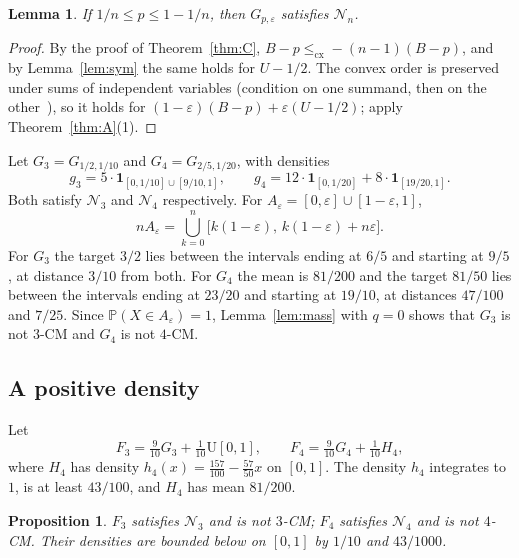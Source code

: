 \documentclass[11pt]{amsart}
\newtheorem{proposition}[theorem]{Proposition}
\newtheorem{lemma}[theorem]{Lemma}
\theoremstyle{definition}
\newcommand{\Prob}{\mathbb{P}}
\newcommand{\cx}{\le_{\mathrm{cx}}}
\newcommand{\one}{\mathbf{1}}
\newcommand{\cN}{\mathcal{N}}
\begin{document}
\begin{lemma}\label{lem:G}
If $1/n\le p\le1-1/n$, then $G_{p,\varepsilon}$ satisfies $\cN_n$.
\end{lemma}

\begin{proof}
By the proof of Theorem~\ref{thm:C}, $B-p\cx-(n-1)(B-p)$, and by Lemma~\ref{lem:sym} the same holds for $U-1/2$. The
convex order is preserved under sums of independent variables (condition on one summand, then on the
other~\cite[Theorem~3.A.12]{SS07}), so it holds for $(1-\varepsilon)(B-p)+\varepsilon(U-1/2)$; apply
Theorem~\ref{thm:A}(1).
\end{proof}

Let $G_3=G_{1/2,1/10}$ and $G_4=G_{2/5,1/20}$, with densities
\[
g_3=5\cdot\one_{[0,1/10]\cup[9/10,1]},\qquad g_4=12\cdot\one_{[0,1/20]}+8\cdot\one_{[19/20,1]}.
\]
Both satisfy $\cN_3$ and $\cN_4$ respectively. For $A_\varepsilon=[0,\varepsilon]\cup[1-\varepsilon,1]$,
\begin{equation}\label{eq:nA}
nA_\varepsilon=\bigcup_{k=0}^n\big[k(1-\varepsilon),\,k(1-\varepsilon)+n\varepsilon\big].
\end{equation}
For $G_3$ the target $3/2$ lies between the intervals ending at $6/5$ and starting at $9/5$, at distance $3/10$ from
both. For $G_4$ the mean is $81/200$ and the target $81/50$ lies between the intervals ending at $23/20$ and starting
at $19/10$, at distances $47/100$ and $7/25$. Since $\Prob(X\in A_\varepsilon)=1$, Lemma~\ref{lem:mass} with $q=0$
shows that $G_3$ is not $3$-CM and $G_4$ is not $4$-CM.

\subsection{A positive density}
Let
\begin{equation}\label{eq:F3F4}
F_3=\tfrac9{10}G_3+\tfrac1{10}\mathrm U[0,1],\qquad F_4=\tfrac9{10}G_4+\tfrac1{10}H_4,
\end{equation}
where $H_4$ has density $h_4(x)=\frac{157}{100}-\frac{57}{50}x$ on $[0,1]$. The density $h_4$ integrates to $1$, is at
least $43/100$, and $H_4$ has mean $81/200$.

\begin{proposition}\label{prop:F}
$F_3$ satisfies $\cN_3$ and is not $3$-CM; $F_4$ satisfies $\cN_4$ and is not $4$-CM. Their densities are bounded below
on $[0,1]$ by $1/10$ and $43/1000$.
\end{proposition}
\end{document}

